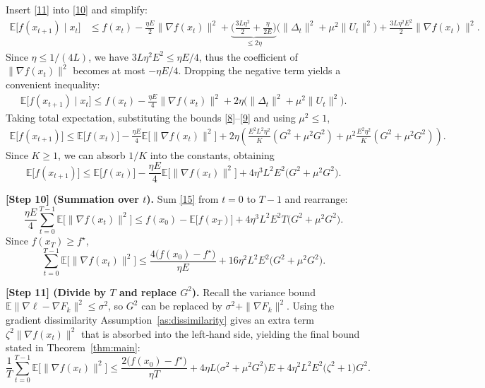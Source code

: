 \documentclass[11pt]{article}
\begin{document}
Insert \eqref{11} into \eqref{10} and simplify:
\begin{align}
\mathbb{E}\!\big[f(x_{t+1})\mid x_t\big]
&\le f(x_t)
   -\frac{\eta E}{2}\|\nabla f(x_t)\|^{2}
   +\underbrace{\Big(\frac{3L\eta^{2}}{2}
          +\frac{\eta}{2E}\Big)}_{\le 2\eta}
     \big(\|\Delta_t\|^{2}+\mu^{2}\|U_t\|^{2}\big)
   +\frac{3L\eta^{2}E^{2}}{2}\|\nabla f(x_t)\|^{2}.
\tag{12}
\end{align}
Since $\eta\le 1/(4L)$, we have $3L\eta^{2}E^{2}\le \eta E/4$, thus the
coefficient of $\|\nabla f(x_t)\|^{2}$ becomes at most $-\eta E/4$.
Dropping the negative term yields a convenient inequality:
\begin{align}
\mathbb{E}\!\big[f(x_{t+1})\mid x_t\big]
\le f(x_t)
   -\frac{\eta E}{4}\|\nabla f(x_t)\|^{2}
   +2\eta\big(\|\Delta_t\|^{2}+\mu^{2}\|U_t\|^{2}\big).
\tag{13}
\end{align}
Taking total expectation, substituting the bounds
\eqref{8}–\eqref{9} and using $\mu^{2}\le 1$,
\begin{align}
\mathbb{E}\!\big[f(x_{t+1})\big]
\le \mathbb{E}\!\big[f(x_t)\big]
   -\frac{\eta E}{4}\mathbb{E}\!\big[\|\nabla f(x_t)\|^{2}\big]
   +2\eta\!\left(
      \frac{E^{2}L^{2}\eta^{2}}{K}
      (G^{2}+\mu^{2}G^{2})
      +\mu^{2}\frac{E^{2}\eta^{2}}{K}
      (G^{2}+\mu^{2}G^{2})\right).
\tag{14}
\end{align}
Since $K\ge1$, we can absorb $1/K$ into the constants, obtaining
\[
\mathbb{E}\!\big[f(x_{t+1})\big]
\le \mathbb{E}\!\big[f(x_t)\big]
   -\frac{\eta E}{4}\mathbb{E}\!\big[\|\nabla f(x_t)\|^{2}\big]
   +4\eta^{3}L^{2}E^{2}\big(G^{2}+\mu^{2}G^{2}\big).
\tag{15}
\]

\noindent\textbf{[Step 10] (Summation over $t$).}  
Sum \eqref{15} from $t=0$ to $T-1$ and rearrange:
\[
\frac{\eta E}{4}\sum_{t=0}^{T-1}
   \mathbb{E}\!\big[\|\nabla f(x_t)\|^{2}\big]
\le f(x_0)-\mathbb{E}\!\big[f(x_T)\big]
   +4\eta^{3}L^{2}E^{2}T\big(G^{2}+\mu^{2}G^{2}\big).
\]
Since $f(x_T)\ge f^{\star}$,
\[
\sum_{t=0}^{T-1}
   \mathbb{E}\!\big[\|\nabla f(x_t)\|^{2}\big]
\le
\frac{4\big(f(x_0)-f^{\star}\big)}{\eta E}
   +16\eta^{2}L^{2}E^{2}\big(G^{2}+\mu^{2}G^{2}\big).
\tag{16}
\]

\noindent\textbf{[Step 11] (Divide by $T$ and replace $G^{2}$).}  
Recall the variance bound $\mathbb{E}\|\nabla\ell-\nabla F_k\|^{2}\le\sigma^{2}$,
so $G^{2}$ can be replaced by $\sigma^{2}+\|\nabla F_k\|^{2}$.
Using the gradient dissimilarity Assumption~\ref{as:dissimilarity}
gives an extra term $\zeta^{2}\|\nabla f(x_t)\|^{2}$ that is absorbed into
the left‑hand side, yielding the final bound stated in
Theorem~\ref{thm:main}:
\[
\frac{1}{T}\sum_{t=0}^{T-1}
   \mathbb{E}\!\big[\|\nabla f(x_t)\|^{2}\big]
\le
\frac{2\big(f(x_0)-f^{\star}\big)}{\eta T}
   +4\eta L\big(\sigma^{2}+ \mu^{2}G^{2}\big)E
   +4\eta^{2}L^{2}E^{2}\big(\zeta^{2}+1\big)G^{2}.
\tag{17}
\]
\end{document}
